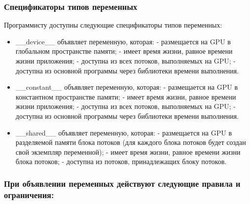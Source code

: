 \documentclass[a4paper, final]{article}
\begin{document}
\subsubsection{Спецификаторы типов переменных} 
Программисту доступны следующие спецификаторы типов переменных:
\begin{itemize}
\item \_\_device\_\_ объявляет переменную, которая: - размещается на GPU в глобальном пространстве памяти; - имеет время жизни, равное времени жизни приложения; - доступна из всех потоков, выполняемых на GPU; - доступна из основной программы через библиотеки времени выполнения.

\item \_\_constant\_\_ объявляет переменную, которая: - размещается на GPU в константном пространстве памяти; - имеет время жизни, равное времени 
жизни приложения; - доступна из всех потоков, выполняемых на GPU; - 
доступна из основной программы через библиотеки времени выполнения.

\item \_\_shared\_\_ объявляет переменную, которая: - размещается на GPU в разделяемой памяти блока потоков (для каждого блока потоков будет 
создан свой экземпляр переменной); - имеет время жизни, равное времени жизни блока потоков; - доступна из потоков, принадлежащих блоку потоков.
\end{itemize}

\subsubsection{При объявлении переменных действуют следующие правила и 
ограничения:}
\end{document}
